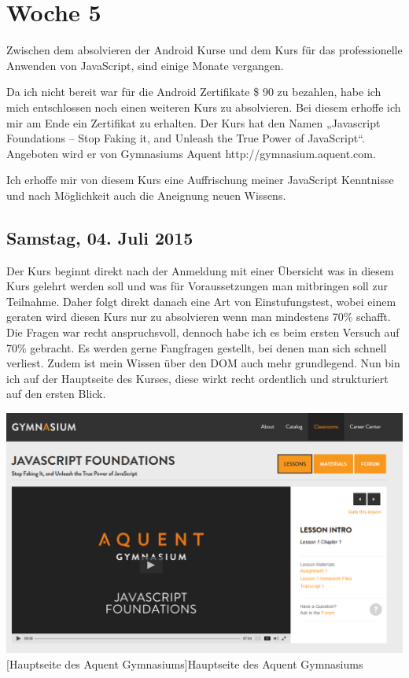 \documentclass[12pt,a4paper,bibliography=totocnumbered,listof=totocnumbered]{scrartcl}
\begin{document}
\pagebreak

\section{Woche 5}
Zwischen dem absolvieren der Android Kurse und dem Kurs für das professionelle Anwenden von JavaScript, sind einige Monate vergangen. 

Da ich nicht bereit war für die Android Zertifikate \$ 90 zu bezahlen, habe ich mich entschlossen noch einen weiteren Kurs zu absolvieren. Bei diesem erhoffe ich mir am Ende ein Zertifikat zu erhalten. \newline
Der Kurs hat den Namen „Javascript Foundations – Stop Faking it, and Unleash the True Power of JavaScript“. Angeboten wird er von Gymnasiums Aquent \newline
\textcolor[rgb]{0,0,1}{http://gymnasium.aquent.com}. 

Ich erhoffe mir von diesem Kurs eine Auffrischung meiner JavaScript Kenntnisse und nach Möglichkeit auch die Aneignung neuen Wissens.

\newpage

\subsection{Samstag, 04. Juli 2015}

Der Kurs beginnt direkt nach der Anmeldung mit einer Übersicht was in diesem Kurs gelehrt werden soll und was für Voraussetzungen man mitbringen soll zur Teilnahme. Daher folgt direkt danach eine Art von Einstufungstest, wobei einem geraten wird diesen Kurs nur zu absolvieren wenn man mindestens 70\% schafft. 
Die Fragen war recht anspruchsvoll, dennoch habe ich es beim ersten Versuch auf 70\% gebracht. Es werden gerne Fangfragen gestellt, bei denen man sich schnell verliest. Zudem ist mein Wissen über den DOM auch mehr grundlegend. 
Nun bin ich auf der Hauptseite des Kurses, diese wirkt recht ordentlich und strukturiert auf den ersten Blick. 

\vspace{1em}
\begin{minipage}{\linewidth}
	\centering
	\includegraphics[width=1\linewidth]{Bilder/mainpage.png}
	[Hauptseite des Aquent Gymnasiums]{Hauptseite des Aquent Gymnasiums \footnotemark }
	\label{fig:osgi}
\end{minipage}
\end{document}

